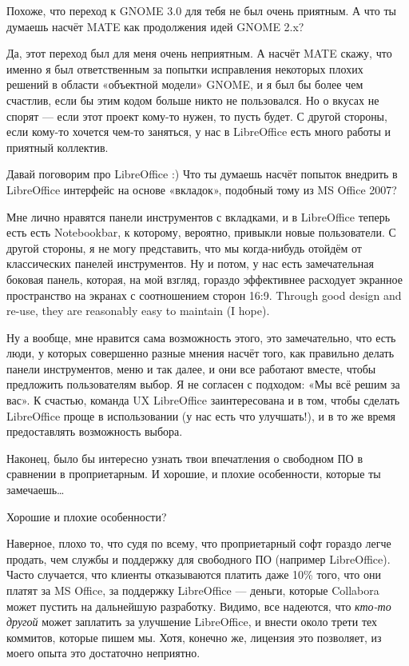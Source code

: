 \documentclass[10pt, a5paper]{article}
\begin{document}
\begin{Parallel}[p]{}{}
{\q Похоже, что переход к GNOME 3.0 для тебя не был очень приятным. А что ты думаешь насчёт MATE как продолжения идей GNOME 2.x?

\a Да, этот переход был для меня очень неприятным. А насчёт MATE скажу, что именно я был ответственным за попытки исправления некоторых плохих решений в области «объектной модели» GNOME, и я был бы более чем счастлив, если бы этим кодом больше никто не пользовался. Но о вкусах не спорят — если этот проект кому-то нужен, то пусть будет. С другой стороны, если кому-то хочется чем-то заняться, у нас в LibreOffice есть много работы и приятный коллектив.

\q Давай поговорим про LibreOffice :) Что ты думаешь насчёт попыток внедрить в LibreOffice интерфейс на основе «вкладок», подобный тому из MS Office 2007?

\a Мне лично нравятся панели инструментов с вкладками, и в LibreOffice теперь есть есть Notebookbar, к которому, вероятно, привыкли новые пользователи. С другой стороны, я не могу представить, что мы когда-нибудь отойдём от классических панелей инструментов. Ну и потом, у нас есть замечательная боковая панель, которая, на мой взгляд, гораздо эффективнее расходует экранное пространство на экранах с соотношением сторон 16:9. Through good design and re-use, they are reasonably easy to maintain (I hope).

Ну а вообще, мне нравится сама возможность этого, это замечательно, что есть люди, у которых совершенно разные мнения насчёт того, как правильно делать панели инструментов, меню и так далее, и они все работают вместе, чтобы предложить пользователям выбор. Я не согласен с подходом: «Мы всё решим за вас». К счастью, команда UX LibreOffice заинтересована и в том, чтобы сделать LibreOffice проще в использовании (у нас есть что улучшать!), и в то же время предоставлять возможность выбора.

\q Наконец, было бы интересно узнать твои впечатления о свободном ПО в сравнении в проприетарным. И хорошие, и плохие особенности, которые ты замечаешь… 

\a Хорошие и плохие особенности?

Наверное, плохо то, что судя по всему, что проприетарный софт гораздо легче продать, чем службы и поддержку для свободного ПО (например LibreOffice). Часто случается, что клиенты отказываются платить даже 10\% того, что они платят за MS Office, за поддержку LibreOffice — деньги, которые Collabora может пустить на дальнейшую разработку. Видимо, все надеются, что \emph{кто-то другой} может заплатить за улучшение LibreOffice, и внести около трети тех коммитов, которые пишем мы. Хотя, конечно же, лицензия это позволяет, из моего опыта это достаточно неприятно.

}
\end{Parallel}
\end{document}
